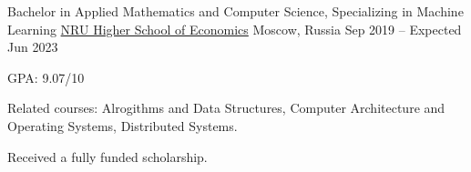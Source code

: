 

\begin{cventries}

  \cventry
  {Bachelor in Applied Mathematics and Computer Science, Specializing in Machine Learning} %
  {\href{https://www.hse.ru/en/}{NRU Higher School of Economics}} %
  {Moscow, Russia} %
  {Sep 2019 -- Expected Jun 2023} %
  {
    \begin{cvitems} %
      \item GPA: 9.07/10
      \item Related courses: 
        Alrogithms and Data Structures, 
        Computer Architecture and Operating Systems, 
        Distributed Systems.
      \item Received a fully funded scholarship.
    \end{cvitems}
  }

\end{cventries}
